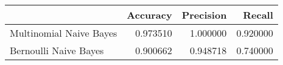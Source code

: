 \begin{tabular}{lrrr}
\toprule
 & Accuracy & Precision & Recall \\
\midrule
Multinomial Naive Bayes & 0.973510 & 1.000000 & 0.920000 \\
Bernoulli Naive Bayes & 0.900662 & 0.948718 & 0.740000 \\
\bottomrule
\end{tabular}
